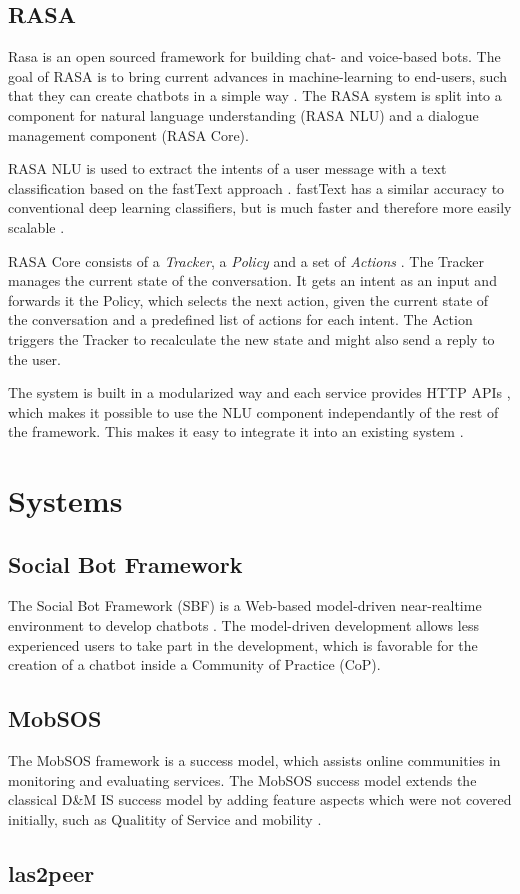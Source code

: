 \subsection{RASA}
Rasa is an open sourced framework for building chat- and voice-based bots. The goal of RASA is to bring current advances in machine-learning to end-users, such that they can create chatbots in a simple way \cite{BFPN17}. The RASA system is split into a component for natural language understanding (RASA NLU) and a dialogue management component (RASA Core).

RASA NLU is used to extract the intents of a user message with a text classification based on the fastText approach \cite{BFPN17}. fastText has a similar accuracy to conventional deep learning classifiers, but is much faster and therefore more easily scalable \cite{JGBM16}.

RASA Core consists of a \emph{Tracker}, a \emph{Policy} and a set of \emph{Actions} \cite{BFPN17}. The Tracker manages the current state of the conversation. It gets an intent as an input and forwards it the Policy, which selects the next action, given the current state of the conversation and a predefined list of actions for each intent. The Action triggers the Tracker to recalculate the new state and might also send a reply to the user.

The system is built in a modularized way and each service provides HTTP APIs \cite{BFPN17}, which makes it possible to use the NLU component independantly of the rest of the framework. This makes it easy to integrate it into an existing system \cite{RaKe19}.

\section{Systems} \label{lab:systems}

\subsection{Social Bot Framework}

The Social Bot Framework (SBF) is a Web-based model-driven near-realtime environment to develop chatbots \cite{NLKl19}. The model-driven development allows less experienced users to take part in the development, which is favorable for the creation of a chatbot inside a Community of Practice (CoP).

\subsection{MobSOS}
The MobSOS framework is a success model, which assists online communities in monitoring and evaluating services. The MobSOS success model extends the classical D\&M IS success model by adding feature aspects which were not covered initially, such as Qualitity of Service and mobility \cite{Renz08}.

\subsection{las2peer}
